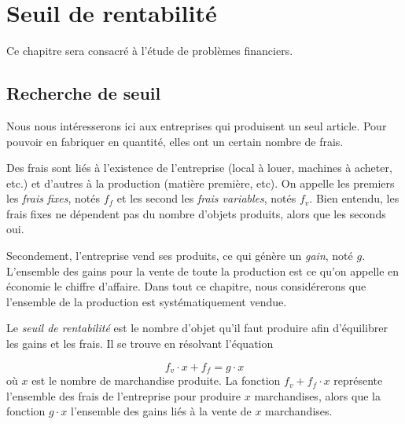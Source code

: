 \chapter{Seuil de rentabilité}

Ce chapitre sera consacré à l'étude de problèmes financiers.

\section{Recherche de seuil}

Nous nous intéresserons ici aux entreprises qui produisent un seul article. Pour pouvoir en fabriquer en quantité, elles ont un certain nombre de frais.

Des frais sont liés à l'existence de l'entreprise (local à louer, machines à acheter, etc.) et d'autres à la production (matière première, etc). On appelle les premiers les \emph{frais fixes}, notés $f_f$ et les second les \emph{frais variables}, notés $f_v$. Bien entendu, les frais fixes ne dépendent pas du nombre d'objets produits, alors que les seconds oui.

Secondement, l'entreprise vend ses produits, ce qui génère un \emph{gain}, noté $g$. L'ensemble des gains pour la vente de toute la production est ce qu'on appelle en économie le chiffre d'affaire. Dans tout ce chapitre, nous considérerons que l'ensemble de la production est systématiquement vendue.

Le \emph{seuil de rentabilité} est le nombre d'objet qu'il faut produire afin d'équilibrer les gains et les frais. Il se trouve en résolvant l'équation

$$
f_v \cdot x + f_f = g\cdot x
$$
où $x$ est le nombre de marchandise produite. La fonction $f_v + f_f \cdot x$ représente l'ensemble des frais de l'entreprise pour produire $x$ marchandises, alors que la fonction $g\cdot x$ l'ensemble des gains liés à la vente de $x$ marchandises.

